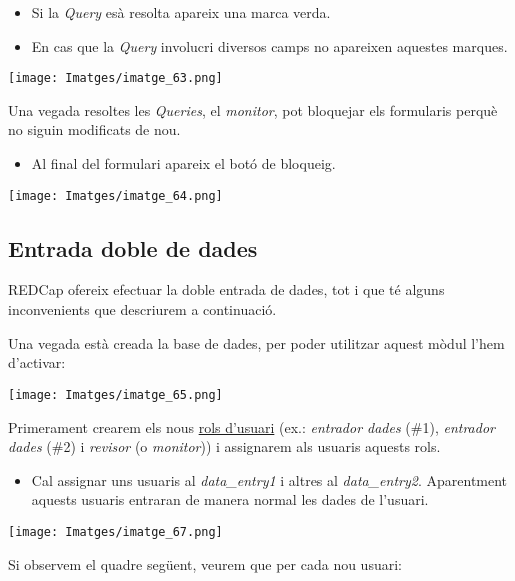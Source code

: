 \documentclass[
]{article}
\providecommand{\tightlist}{%
  \setlength{\itemsep}{0pt}\setlength{\parskip}{0pt}}
\begin{document}
\begin{itemize}
\tightlist
\item
  Si la \emph{Query} esà resolta apareix una marca verda.
\item
  En cas que la \emph{Query} involucri diversos camps no apareixen aquestes marques.
\end{itemize}

\texttt{[image: Imatges/imatge\_63.png]}

Una vegada resoltes les \emph{Queries}, el \emph{monitor}, pot bloquejar els formularis perquè no siguin modificats de nou.

\begin{itemize}
\tightlist
\item
  Al final del formulari apareix el botó de bloqueig.
\end{itemize}

\texttt{[image: Imatges/imatge\_64.png]}

\hypertarget{entrada-doble-de-dades}{%
\subsection{\texorpdfstring{\textbf{Entrada doble de dades}}{Entrada doble de dades}}\label{entrada-doble-de-dades}}

REDCap ofereix efectuar la doble entrada de dades, tot i que té alguns inconvenients que descriurem a continuació.

Una vegada està creada la base de dades, per poder utilitzar aquest mòdul l'hem d'activar:

\texttt{[image: Imatges/imatge\_65.png]}

Primerament crearem els nous \protect\hyperlink{en3}{rols d'usuari} (ex.: \emph{entrador dades} (\#1), \emph{entrador dades} (\#2) i \emph{revisor} (o \emph{monitor})) i assignarem als usuaris aquests rols.

\begin{itemize}
\tightlist
\item
  Cal assignar uns usuaris al \emph{data\_entry1} i altres al \emph{data\_entry2}. Aparentment aquests usuaris entraran de manera normal les dades de l'usuari.
\end{itemize}

\texttt{[image: Imatges/imatge\_67.png]}

Si observem el quadre següent, veurem que per cada nou usuari:
\end{document}
